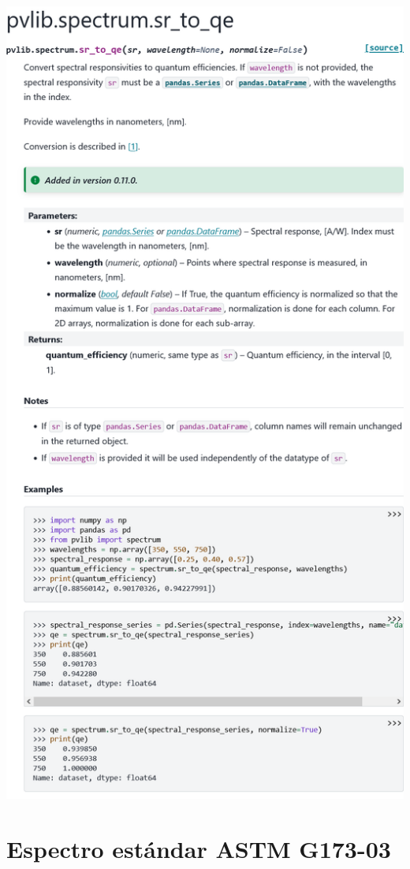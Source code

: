 \begin{myparindent}{0pt}
\includegraphics[width=\linewidth,height=0.9\textheight,keepaspectratio]{images/docs_funcs_cut/sr_to_qe_0.png}

\newpage\section{Espectro estándar ASTM G173-03} \label{sct:doc_espectro_astm-173-03}


\end{myparindent}
